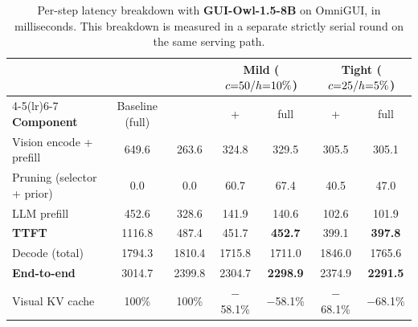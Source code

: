 \begin{table}[t]
    \centering
    \caption{Per-step latency breakdown with \textbf{GUI-Owl-1.5-8B} on OmniGUI, in milliseconds. This breakdown is measured in a separate strictly serial round on the same serving path.}
    \label{tab:efficiency}
    \footnotesize
    \setlength{\tabcolsep}{4.5pt}
    \renewcommand{\arraystretch}{1.0}
    \begin{tabular}{l cc cc cc}
        \toprule
        & & & \multicolumn{2}{c}{\textbf{Mild} ($c{=}50/h{=}10\%$)} & \multicolumn{2}{c}{\textbf{Tight} ($c{=}25/h{=}5\%$)} \\
        \cmidrule(lr){4-5}\cmidrule(lr){6-7}
        \textbf{Component} & Baseline (full) & \kvr{} & \lmp{}+\nwe{} & \method{} full & \lmp{}+\nwe{} & \method{} full \\
        \midrule
        Vision encode + prefill & 649.6 & 263.6 & 324.8 & 329.5 & 305.5 & 305.1 \\
        Pruning (selector + prior) & 0.0 & 0.0 & 60.7 & 67.4 & 40.5 & 47.0 \\
        LLM prefill & 452.6 & 328.6 & 141.9 & 140.6 & 102.6 & 101.9 \\
        \textbf{TTFT} & 1116.8 & 487.4 & 451.7 & \textbf{452.7} & 399.1 & \textbf{397.8} \\
        Decode (total) & 1794.3 & 1810.4 & 1715.8 & 1711.0 & 1846.0 & 1765.6 \\
        \textbf{End-to-end} & 3014.7 & 2399.8 & 2304.7 & \textbf{2298.9} & 2374.9 & \textbf{2291.5} \\
        Visual KV cache & 100\% & 100\% & $-$58.1\% & $-$58.1\% & $-$68.1\% & $-$68.1\% \\
        \bottomrule
    \end{tabular}
\end{table}
